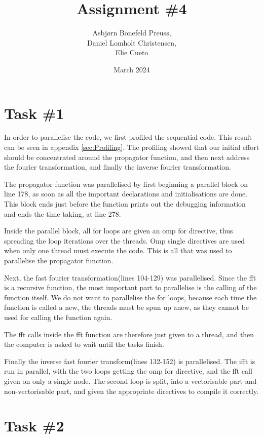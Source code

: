 \documentclass{article}
\title{Assignment \#4}
\author{Asbjørn Bonefeld Preuss,\\ Daniel Lomholt Christensen,\\ Elie Cueto}
\date{March 2024}
\begin{document}
\maketitle
\section{Task \#1}
In order to parallelise the code, we first profiled the sequential code. This result can be seen in appendix \ref{sec:Profiling}. The profiling showed that our initial effort should be concentrated around the propagator function, and then next address the fourier transformation, and finally the inverse fourier transformation.

The propagator function was parallelised by first beginning a parallel block on line 178, as soon as all the important declarations and initialisations are done. This block ends just before the function prints out the debugging information and ends the time taking, at line 278. 

Inside the parallel block, all for loops are given an omp for directive, thus spreading the loop iterations over the threads. Omp single directives are used when only one thread must execute the code. This is all that was used to parallelise the propagator function.

Next, the fast fourier transformation(lines 104-129) was parallelised. Since the fft is a recursive function, the most important part to parallelise is the calling of the function itself. We do not want to parallelise the for loops, because each time the function is called a new, the threads must be spun up anew, as they cannot be used for calling the function again.

The fft calls inside the fft function are therefore just given to a thread, and then the computer is asked to wait until the tasks finish.

Finally the inverse fast fourier transform(lines 132-152) is parallelised. The ifft is run in parallel, with the two loops getting the omp for directive, and the fft call given on only a single node. The second loop is split, into a vectorisable part and non-vectorisable part, and given the appropriate directives to compile it correctly.

\section{Task \#2}

\appendix
\end{document}
